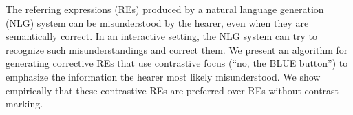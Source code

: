 The referring expressions (REs) produced by a natural language generation (NLG) system can be misunderstood by the hearer, even when they are semantically correct. In an interactive setting, the NLG system can try to recognize such misunderstandings and correct them. We present an algorithm for generating corrective REs that use contrastive focus (``no, the BLUE button'') to emphasize the information the hearer most likely misunderstood. We show empirically that these contrastive REs are preferred over REs without contrast marking.
